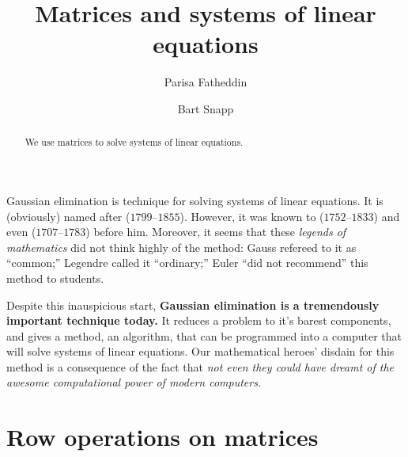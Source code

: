 \documentclass{ximera}
\author{Parisa Fatheddin \and Bart Snapp}
\title{Matrices and systems of linear equations}
\begin{document}
\begin{abstract}
  We use matrices to solve systems of linear equations.
\end{abstract}
\maketitle

Gaussian elimination is technique for solving systems of linear
equations. It is (obviously) named after
($1799$--$1855$). However, it was known to
($1752$--$1833$) and even
($1707$--$1783$) before him. Moreover, it seems that these \textit{legends of
mathematics} did not think highly of the method: Gauss refereed to it
as ``common;'' Legendre called it ``ordinary;'' Euler ``did not
recommend'' this method to students.




Despite this inauspicious start, \textbf{Gaussian elimination is a
  tremendously important technique today.} It reduces a problem to
it's barest components, and gives a method, an algorithm, that can be
programmed into a computer that will solve systems of linear
equations. Our mathematical heroes' disdain for this method is a
consequence of the fact that \textit{not even they could have dreamt of the awesome
computational power of modern computers.}



\section{Row operations on matrices}
\end{document}
